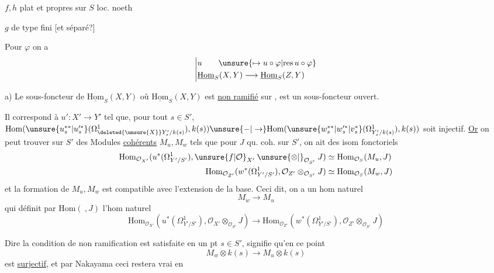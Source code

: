


$f,h$ plat et propres sur $S$ loc. noeth

$g$  de type fini [et séparé?]


Pour $\varphi$ on a
\[
\left|\begin{aligned}
&u \qquad \unsure{\mapsto u\circ\varphi|\text{res}\,u\circ\varphi}\\
&\underline{\mathrm{Hom}}_S(X,Y)\longrightarrow\underline{\mathrm{Hom}}_S(Z,Y)
\end{aligned}\right.
\]

a) Le sous-foncteur de $\underline{\mathrm{Hom}}_S(X,Y)$ où $\underline{\mathrm{Hom}}_S(X,Y)$ est \uline{non ramifié} sur , est un sous-foncteur ouvert.

Il correspond à $u':X'\to Y'$ tel que, pour tout $s\in S'$, $\mathrm{Hom}(\unsure{u_s^{**}|u_s^{\prime *}}(\Omega^1_{\deleted{\unsure{X}}Y'_s/k(s)}),k(s))\unsure{-|\to}\mathrm{Hom}(\unsure{w_s^{**}|w_s^{\prime *}|v_s^{*}}(\Omega^1_{Y'_s/k(s)}),k(s))$ soit injectif. \uline{Or} on peut trouver sur $S'$ des Modules \uline{cohérents} $M_u,M_w$ tels que pour  $J$ qu. coh. sur $S'$, on ait des isom fonctoriels
\[
\begin{aligned}
\mathrm{Hom}_{\mathcal O_{X'}}(u^*(\Omega^1_{Y'/S'}),\unsure{f|\mathcal O}_{X'}\mathbin{\unsure{\otimes|{}}}_{\mathcal O_{S'}}J)&\simeq\mathrm{Hom}_{\mathcal O_S}(M_u,J)\\
\mathrm{Hom}_{\mathcal O_{Z'}}(w^*(\Omega^1_{Y'/S'}),\mathcal O_{Z'}\otimes_{\mathcal O_{S'}}J)&\simeq\mathrm{Hom}_{\mathcal O_S}(M_w,J)
\end{aligned}
\]
et la formation de $M_u,M_w$ est compatible avec l'extension de la base. Ceci dit, on a un hom naturel
\[
M_w\longrightarrow M_u\tag*{(*)}
\]
qui définit par $\mathrm{Hom}(\ ,J)$ l'hom naturel
\[
\mathrm{Hom}_{\mathcal O_{X'}}(u^*(\Omega^1_{Y'/S'}),\mathcal O_{X'}\otimes_{\mathcal O_{S'}}J)\longrightarrow
\mathrm{Hom}_{\mathcal O_{Z'}}(w^*(\Omega^1_{Y'/S'}),\mathcal O_{Z'}\otimes_{\mathcal O_{S'}}J)
\]

Dire  la condition de non ramification est satisfaite en un pt $s\in S'$, signifie qu'en ce point
\[
M_w\otimes k(s)\longrightarrow M_u\otimes k(s)
\]
est \uline{surjectif}, et par Nakayama ceci restera vrai en
